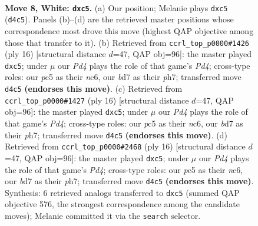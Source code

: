 \documentclass[11pt]{article}
\begin{document}
\begin{figure}[p]\centering
\begin{subfigure}{0.46\textwidth}\centering
\resizebox{\linewidth}{!}{%
\newchessgame
\chessboard[
  setfen={rn1qkb1r/1p1b1ppp/p3pn2/2p5/P1BP4/4PN2/1P3PPP/RNBQ1RK1 w kq - 1 8},
  showmover=false,
  pgfstyle=straightmove, color=movearrow, markmove={d4-c5}
]}
\caption{}
\end{subfigure}\hfill
\begin{subfigure}{0.46\textwidth}\centering
\resizebox{\linewidth}{!}{%
\newchessgame
\chessboard[
  setfen={r1bqk2r/1p2bppp/p1n1pn2/2p5/P1BP4/4PN2/1P2QPPP/RNB2RK1 w kq - 3 9},
  showmover=false,
  pgfstyle=straightmove, color=movearrow, markmove={d4-c5}
]}
\caption{}
\end{subfigure}
\\[4pt]
\begin{subfigure}{0.46\textwidth}\centering
\resizebox{\linewidth}{!}{%
\newchessgame
\chessboard[
  setfen={r1bqk2r/1p2bppp/p1n1pn2/2p5/P1BP4/4PN2/1P2QPPP/RNB2RK1 w kq - 3 9},
  showmover=false,
  pgfstyle=straightmove, color=movearrow, markmove={d4-c5}
]}
\caption{}
\end{subfigure}\hfill
\begin{subfigure}{0.46\textwidth}\centering
\resizebox{\linewidth}{!}{%
\newchessgame
\chessboard[
  setfen={r1bqk2r/1p2bppp/p1n1pn2/2p5/P1BP4/4PN2/1P2QPPP/RNB2RK1 w kq - 3 9},
  showmover=false,
  pgfstyle=straightmove, color=movearrow, markmove={d4-c5}
]}
\caption{}
\end{subfigure}
\caption{\textbf{Move 8, White: \texttt{dxc5}.} (a) Our position; Melanie plays \texttt{dxc5} (\texttt{d4c5}). Panels (b)--(d) are the retrieved master positions whose correspondence most drove this move (highest QAP objective among those that transfer to it). (b) Retrieved from \texttt{ccrl\_top\_p0000\#1426} (ply 16) [structural distance $d$=47, QAP obj=96]: the master played \texttt{dxc5}; under $\mu$ our \emph{Pd4} plays the role of that game's \emph{Pd4}; cross-type roles: our \emph{p}c5 as their \emph{n}c6, our \emph{b}d7 as their \emph{p}h7; transferred move \texttt{d4c5} \textbf{(endorses this move)}. (c) Retrieved from \texttt{ccrl\_top\_p0000\#1427} (ply 16) [structural distance $d$=47, QAP obj=96]: the master played \texttt{dxc5}; under $\mu$ our \emph{Pd4} plays the role of that game's \emph{Pd4}; cross-type roles: our \emph{p}c5 as their \emph{n}c6, our \emph{b}d7 as their \emph{p}h7; transferred move \texttt{d4c5} \textbf{(endorses this move)}. (d) Retrieved from \texttt{ccrl\_top\_p0000\#2468} (ply 16) [structural distance $d$=47, QAP obj=96]: the master played \texttt{dxc5}; under $\mu$ our \emph{Pd4} plays the role of that game's \emph{Pd4}; cross-type roles: our \emph{p}c5 as their \emph{n}c6, our \emph{b}d7 as their \emph{p}h7; transferred move \texttt{d4c5} \textbf{(endorses this move)}. Synthesis: 6 retrieved analogs transferred to \texttt{dxc5} (summed QAP objective 576, the strongest correspondence among the candidate moves); Melanie committed it via the \texttt{search} selector.}
\label{fig:thought-m14}
\end{figure}
\end{document}
